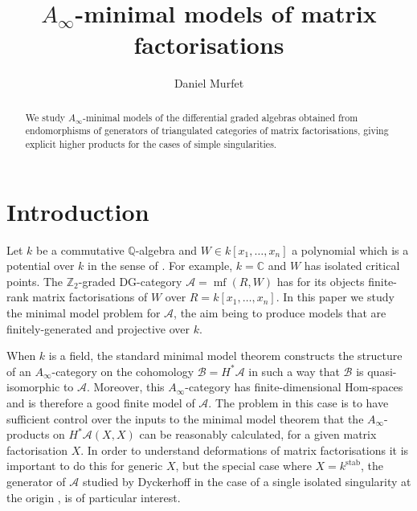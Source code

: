 \documentclass[english,letter paper,12pt,leqno]{article}
\theoremstyle{example}
\numberwithin{equation}{section}
\def\res{\operatorname{Res}}
\def\stab{\operatorname{stab}}
\def\nZ{\mathds{Z}}
\begin{document}
\def\Res{\res\!}
\newcommand{\ud}{\mathrm{d}}
\newcommand{\Ress}[1]{\res_{#1}\!}
\newcommand{\cat}[1]{\mathcal{#1}}
\newcommand{\lto}{\longrightarrow}
\newcommand{\xlto}[1]{\stackrel{#1}\lto}
\newcommand{\mf}[1]{\mathfrak{#1}}
\newcommand{\md}[1]{\mathscr{#1}}
\def\sus{\l}
\def\l{\,|\,}
\def\sgn{\textup{sgn}}

\title{$A_\infty$-minimal models of matrix factorisations}
\author{Daniel Murfet}

\maketitle

\begin{abstract}
We study $A_\infty$-minimal models of the differential graded algebras obtained from endomorphisms of generators of triangulated categories of matrix factorisations, giving explicit higher products for the cases of simple singularities. 
\end{abstract}

\section{Introduction}

Let $k$ be a commutative $\mathbb{Q}$-algebra and $W \in k[x_1,\ldots,x_n]$ a polynomial which is a potential over $k$ in the sense of \cite[\S 2.2]{lgdual}. For example, $k = \mathbb{C}$ and $W$ has isolated critical points. The $\nZ_2$-graded DG-category $\cat{A} = \operatorname{mf}(R, W)$ has for its objects finite-rank matrix factorisations of $W$ over $R = k[x_1,\ldots,x_n]$. In this paper we study the minimal model problem for $\cat{A}$, the aim being to produce models that are finitely-generated and projective over $k$.

When $k$ is a field, the standard minimal model theorem \cite{??} constructs the structure of an $A_\infty$-category on the cohomology $\cat{B} = H^* \cat{A}$ in such a way that $\cat{B}$ is quasi-isomorphic to $\cat{A}$. Moreover, this $A_\infty$-category has finite-dimensional Hom-spaces and is therefore a good finite model of $\cat{A}$. The problem in this case is to have sufficient control over the inputs to the minimal model theorem that the $A_\infty$-products on $H^* \cat{A}(X,X)$ can be reasonably calculated, for a given matrix factorisation $X$. In order to understand deformations of matrix factorisations \cite{??,??,??} it is important to do this for generic $X$, but the special case where $X = k^{\stab}$, the generator of $\cat{A}$ studied by Dyckerhoff in the case of a single isolated singularity at the origin \cite{d0904.4713}, is of particular interest.
\end{document}
